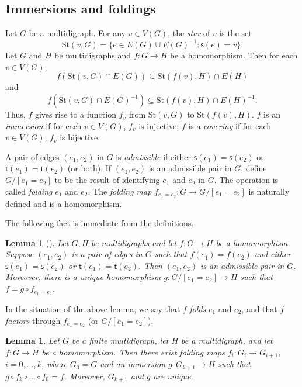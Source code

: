 \documentclass[10pt,a4paper]{amsart}
\newtheorem{lemma}[theorem]{Lemma}
\theoremstyle{definition}
\theoremstyle{definition}
\numberwithin{equation}{section}
\begin{document}
\subsection{Immersions and foldings} 

Let $G$ be a multidigraph. For any $v\in V(G)$, the {\em star} of $v$ is the set
$$ \mbox{St}(v, G)=\{e\in E(G)\cup E(G)^{-1}\colon \mathsf{s}(e)=v\}. $$
Let $G$ and $H$ be multidigraphs and $f\colon G\to H$ be a homomorphism. Then for each $v\in V(G)$, 
$$ f(\mbox{St}(v, G)\cap E(G))\subseteq \mbox{St}(f(v), H)\cap E(H)$$
and $$ f(\mbox{St}(v, G)\cap E(G)^{-1})\subseteq \mbox{St}(f(v), H)\cap E(H)^{-1}. $$
Thus, $f$ gives rise to a function $f_v$ from $\mbox{St}(v, G)$ to $\mbox{St}(f(v), H)$. $f$ is an {\em immersion} if for each $v\in V(G)$, $f_v$ is injective; $f$ is a {\em covering} if for each $v\in V(G)$, $f_v$ is bijective.

A pair of edges $(e_1, e_2)$ in $G$ is {\em admissible} if either $\mathsf{s}(e_1)=\mathsf{s}(e_2)$ or $\mathsf{t}(e_1)=\mathsf{t}(e_2)$ (or both). If $(e_1,e_2)$ is an admissible pair in $G$, define $G/[e_1=e_2]$ to be the result of identifying $e_1$ and $e_2$ in $G$. The operation is called {\em folding} $e_1$ and $e_2$. The {\em folding map} $f_{e_1=e_2}\colon G\to G/[e_1=e_2]$ is naturally defined and is a homomorphism. 

The following fact is immediate from the definitions.

\begin{lemma}[{\cite[3.3]{St83}}] Let $G, H$ be multidigraphs and let $f\colon G\to H$ be a homomorphism. Suppose $(e_1, e_2)$ is a pair of edges in $G$ such that $f(e_1)=f(e_2)$ and either $\mathsf{s}(e_1)=\mathsf{s}(e_2)$ or $\mathsf{t}(e_1)=\mathsf{t}(e_2)$. Then $(e_1, e_2)$ is an admissible pair in $G$. Moreover, there is a unique homomorphism $g\colon G/[e_1=e_2]\to H$ such that $f=g\circ f_{e_1=e_2}$. 
\end{lemma}


In the situation of the above lemma, we say that $f$ {\em folds} $e_1$ and $e_2$, and that $f$ {\em factors} through $f_{e_1=e_2}$ (or $G/[e_1=e_2]$).

\begin{lemma}\label{lem:folds} Let $G$ be a finite multidigraph, let $H$ be a multidigraph, and let $f\colon G\to H$ be a homomorphism. Then there exist folding maps $f_i\colon G_i\to G_{i+1}$, $i=0,\dots, k$, where $G_0=G$ and an immersion $g\colon G_{k+1}\to H$ such that $g\circ f_k\circ \dots \circ f_0=f$. Moreover, $G_{k+1}$ and $g$ are unique.
\end{lemma}
\end{document}
